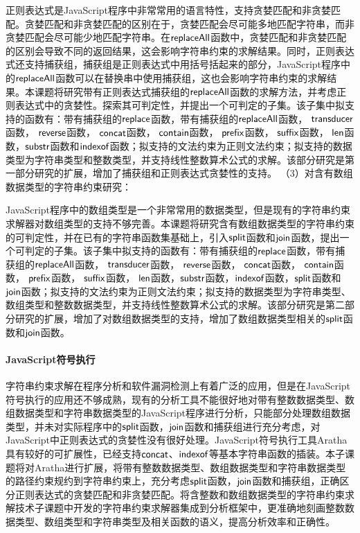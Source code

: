 正则表达式是JavaScript程序中非常常用的语言特性，支持贪婪匹配和非贪婪匹配。贪婪匹配和非贪婪匹配的区别在于，贪婪匹配会尽可能多地匹配字符串，而非贪婪匹配会尽可能少地匹配字符串。在$\mathsf{replaceAll}$函数中，贪婪匹配和非贪婪匹配的区别会导致不同的返回结果，这会影响字符串约束的求解结果。同时，正则表达式还支持捕获组，捕获组是正则表达式中用括号括起来的部分，JavaScript程序中的$\mathsf{replaceAll}$函数可以在替换串中使用捕获组，这也会影响字符串约束的求解结果。本课题将研究带有正则表达式捕获组的$\mathsf{replaceAll}$函数的求解方法，并考虑正则表达式中的贪婪性。探索其可判定性，并提出一个可判定的子集。该子集中拟支持的函数有：带有捕获组的$\mathsf{replace}$函数，带有捕获组的$\mathsf{replaceAll}$函数， $\mathsf{transducer}$函数， $\mathsf{reverse}$函数， $\mathsf{concat}$函数， $\mathsf{contain}$函数， $\mathsf{prefix}$函数， $\mathsf{suffix}$函数， $\mathsf{len}$函数，$\mathsf{substr}$函数和$\mathsf{indexof}$函数；拟支持的文法约束为正则文法约束；拟支持的数据类型为字符串类型和整数类型，并支持线性整数算术公式的求解。该部分研究是第一部分研究的扩展，增加了捕获组和正则表达式贪婪性的支持。\newline
（3）对含有数组数据类型的字符串约束研究：

JavaScript程序中的数组类型是一个非常常用的数据类型，但是现有的字符串约束求解器对数组类型的支持不够完善。本课题将研究含有数组数据类型的字符串约束的可判定性，并在已有的字符串函数集基础上，引入$\mathsf{split}$函数和$\mathsf{join}$函数，提出一个可判定的子集。该子集中拟支持的函数有：带有捕获组的$\mathsf{replace}$函数，带有捕获组的$\mathsf{replaceAll}$函数， $\mathsf{transducer}$函数， $\mathsf{reverse}$函数， $\mathsf{concat}$函数， $\mathsf{contain}$函数， $\mathsf{prefix}$函数， $\mathsf{suffix}$函数， $\mathsf{len}$函数，$\mathsf{substr}$函数，$\mathsf{indexof}$函数，$\mathsf{split}$函数和$\mathsf{join}$函数；拟支持的文法约束为正则文法约束；拟支持的数据类型为字符串类型、数组类型和整数数据类型，并支持线性整数算术公式的求解。该部分研究是第二部分研究的扩展，增加了对数组数据类型的支持，增加了数组数据类型相关的$\mathsf{split}$函数和$\mathsf{join}$函数。

\paragraph{JavaScript符号执行} 字符串约束求解在程序分析和软件漏洞检测上有着广泛的应用，但是在JavaScript符号执行的应用还不够成熟，现有的分析工具不能很好地对带有整数数据类型、数组数据类型和字符串数据类型的JavaScript程序进行分析，只能部分处理数组数据类型，并未对实际程序中的$\mathsf{split}$函数，$\mathsf{join}$函数和捕获组进行充分考虑，对JavaScript中正则表达式的贪婪性没有很好处理。JavaScript符号执行工具Aratha\cite{aratha}具有较好的可扩展性，已经支持$\mathsf{concat}$、$\mathsf{indexof}$等基本字符串函数的插装。本子课题将对Aratha进行扩展，将带有整数数据类型、数组数据类型和字符串数据类型的路径约束规约到字符串约束上，充分考虑$\mathsf{split}$函数，$\mathsf{join}$函数和捕获组，正确区分正则表达式的贪婪匹配和非贪婪匹配。将含整数和数组数据类型的字符串约束求解技术子课题中开发的字符串约束求解器集成到分析框架中，更准确地刻画整数数据类型、数组类型和字符串类型及相关函数的语义，提高分析效率和正确性。

